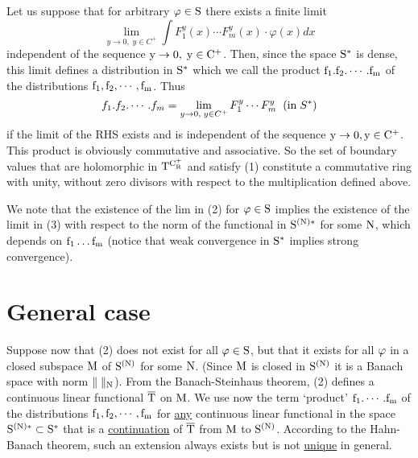 \documentclass[12pt]{article}
\begin{document}
Let us suppose that for arbitrary  $\rm \varphi \in S$ there exists a
finite limit
\begin{equation}
\lim_{y \rightarrow 0, \;y\in C^+} \int  F_1^y (x) \cdots F^y_m (x) \cdot
\varphi (x) dx
\end{equation}
independent of the sequence $\rm y \rightarrow 0 , \; y \in C^+$. Then,
since the space $\rm S^*$ is
dense, this limit defines a distribution in $\rm S^*$ which we call the
product $\rm f_1 . f_2 .\cdots
.f_m$ of the distributions $\rm f_1, f_2,\cdots , f_m$. Thus
\begin{equation}
f_1. f_2. \cdots . f_m = \lim_{y\rightarrow 0 , \; y \in C^+} F^y_1 \cdots
F^y_m\;\;({\rm in}\; S^*)
\end{equation}
if the limit of the RHS exists and is independent of the sequence $\rm y
\rightarrow 0 , y \in C^+$.
This product is obviously commutative and associative. So  the set of
boundary values that are
holomorphic in $\rm T^{C^+_R}$ and satisfy (1) constitute a commutative
ring with unity, without zero
divisors with respect to the multiplication defined above.

We note that the existence of the lim in (2) for $\rm \varphi \in S$
implies the existence of the
limit in (3) with respect to the norm of the functional in $\rm S^{(N)*}$
for some $\rm N$, which depends
on
$\rm f_1 \dots f_m$ (notice that weak convergence in $\rm S^*$ implies
strong convergence).

\section{General case}

Suppose now that (2) does not exist for all $\rm \varphi \in S$, but that
it exists for all $\rm \varphi$
in a closed subspace  $\rm M$ of $\rm S^{(N)}$ for some $\rm N$. (Since
$\rm M$ is closed in $\rm
S^{(N)}$ it is a Banach space with norm $\rm \|\;\|_N$). From the
Banach-Steinhaus theorem, (2) defines a
continuous linear functional $\rm \overline T$ on $\rm M$. We use now the
term `product' $\rm f_1.
\cdots . f_m$ of the distributions $\rm f_1, f_2, \cdots , f_m$ for
\underline{any} continuous linear
functional in the space $\rm S^{(N)*}\subset S^*$ that is a
\underline{continuation} of $\rm \overline T$
from
$\rm M$ to
$\rm S^{(N)}$. According to the Hahn-Banach theorem, such an extension
always exists but is not
\underline{unique} in general.
\end{document}
